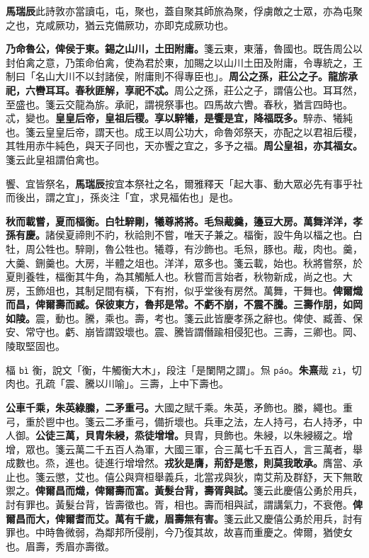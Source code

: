 \begin{quoting}\textbf{馬瑞辰}此詩敦亦當讀屯，屯，聚也，蓋自聚其師旅為聚，俘虜敵之士眾，亦為屯聚之也，克咸厥功，猶云克備厥功，亦即克成厥功也。\end{quoting}

\textbf{乃命魯公，俾侯于東。錫之山川，土田附庸。}{\footnotesize 箋云東，東藩，魯國也。既告周公以封伯禽之意，乃策命伯禽，使為君於東，加賜之以山川土田及附庸，令專統之，王制曰「名山大川不以封諸侯，附庸則不得專臣也」。}\textbf{周公之孫，莊公之子。龍旂承祀，六轡耳耳。春秋匪解，享祀不忒。}{\footnotesize 周公之孫，莊公之子，謂僖公也。耳耳然，至盛也。箋云交龍為旂。承祀，謂視祭事也。四馬故六轡。春秋，猶言四時也。忒，變也。}\textbf{皇皇后帝，皇祖后稷。享以騂犧，是饗是宜，降福既多。}{\footnotesize 騂赤、犧純也。箋云皇皇后帝，謂天也。成王以周公功大，命魯郊祭天，亦配之以君祖后稷，其牲用赤牛純色，與天子同也，天亦饗之宜之，多予之福。}\textbf{周公皇祖，亦其福女。}{\footnotesize 箋云此皇祖謂伯禽也。}

\begin{quoting}饗、宜皆祭名，\textbf{馬瑞辰}按宜本祭社之名，爾雅釋天「起大事、動大眾必先有事乎社而後出，謂之宜」，孫炎注「宜，求見福佑也」是也。\end{quoting}

\textbf{秋而載嘗，夏而楅衡。白牡騂剛，犧尊將將。毛炰胾羹，籩豆大房。萬舞洋洋，孝孫有慶。}{\footnotesize 諸侯夏禘則不礿，秋祫則不嘗，唯天子兼之。楅衡，設牛角以楅之也。白牡，周公牲也。騂剛，魯公牲也。犧尊，有沙飾也。毛炰，豚也。胾，肉也。羹，大羹、鉶羹也。大房，半體之俎也。洋洋，眾多也。箋云載，始也。秋將嘗祭，於夏則養牲，楅衡其牛角，為其觸觝人也。秋嘗而言始者，秋物新成，尚之也。大房，玉飾俎也，其制足間有橫，下有拊，似乎堂後有房然。萬舞，干舞也。}\textbf{俾爾熾而昌，俾爾壽而臧。保彼東方，魯邦是常。不虧不崩，不震不騰。三壽作朋，如岡如陵。}{\footnotesize 震，動也。騰，乘也。壽，考也。箋云此皆慶孝孫之辭也。俾使、臧善、保安、常守也。虧、崩皆謂毀壞也。震、騰皆謂僭踰相侵犯也。三壽，三卿也。岡、陵取堅固也。}

\begin{quoting}楅 \texttt{bì} 衡，說文「衡，牛觸衡大木」，段注「是闌閈之謂」。炰 \texttt{páo}。\textbf{朱熹}胾 \texttt{zì}，切肉也。孔疏「震、騰以川喻」。三壽，上中下壽也。\end{quoting}

\textbf{公車千乘，朱英綠縢，二矛重弓。}{\footnotesize 大國之賦千乘。朱英，矛飾也。縢，繩也。重弓，重於鬯中也。箋云二矛重弓，備折壞也。兵車之法，左人持弓，右人持矛，中人御。}\textbf{公徒三萬，貝胄朱綅，烝徒增增。}{\footnotesize 貝胄，貝飾也。朱綅，以朱綅綴之。增增，眾也。箋云萬二千五百人為軍，大國三軍，合三萬七千五百人，言三萬者，舉成數也。烝，進也。徒進行增增然。}\textbf{戎狄是膺，荊舒是懲，則莫我敢承。}{\footnotesize 膺當、承止也。箋云懲，艾也。僖公與齊桓舉義兵，北當戎與狄，南艾荊及群舒，天下無敢禦之。}\textbf{俾爾昌而熾，俾爾壽而富。黃髮台背，壽胥與試。}{\footnotesize 箋云此慶僖公勇於用兵，討有罪也。黃髮台背，皆壽徵也。胥，相也。壽而相與試，謂講氣力，不衰倦。}\textbf{俾爾昌而大，俾爾耆而艾。萬有千歲，眉壽無有害。}{\footnotesize 箋云此又慶僖公勇於用兵，討有罪也。中時魯微弱，為鄰邦所侵削，今乃復其故，故喜而重慶之。俾爾，猶使女也。眉壽，秀眉亦壽徵。}

